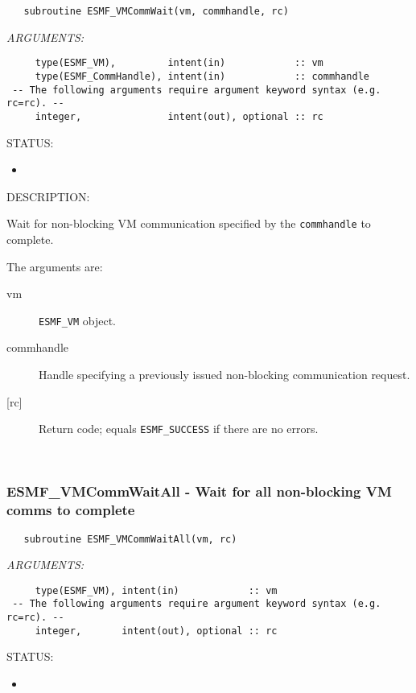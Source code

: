  
\begin{verbatim}   subroutine ESMF_VMCommWait(vm, commhandle, rc)\end{verbatim}{\em ARGUMENTS:}
\begin{verbatim}     type(ESMF_VM),         intent(in)            :: vm
     type(ESMF_CommHandle), intent(in)            :: commhandle
 -- The following arguments require argument keyword syntax (e.g. rc=rc). --
     integer,               intent(out), optional :: rc\end{verbatim}
{\sf STATUS:}
   \begin{itemize}
   \item{}
   \end{itemize}
  
{\sf DESCRIPTION:\\ }


     Wait for non-blocking VM communication specified by the {\tt commhandle} to
     complete.
  
     The arguments are:
     \begin{description}
     \item[vm] 
          {\tt ESMF\_VM} object.
     \item[commhandle] 
          Handle specifying a previously issued non-blocking communication 
          request.
     \item[{[rc]}] 
          Return code; equals {\tt ESMF\_SUCCESS} if there are no errors.
     \end{description}
   
 
\mbox{}\hrulefill\ 
 
\subsubsection [ESMF\_VMCommWaitAll] {ESMF\_VMCommWaitAll - Wait for all non-blocking VM comms to complete}


 
\begin{verbatim}   subroutine ESMF_VMCommWaitAll(vm, rc)\end{verbatim}{\em ARGUMENTS:}
\begin{verbatim}     type(ESMF_VM), intent(in)            :: vm
 -- The following arguments require argument keyword syntax (e.g. rc=rc). --
     integer,       intent(out), optional :: rc\end{verbatim}
{\sf STATUS:}
   \begin{itemize}
   \item{}
   \end{itemize}
  
